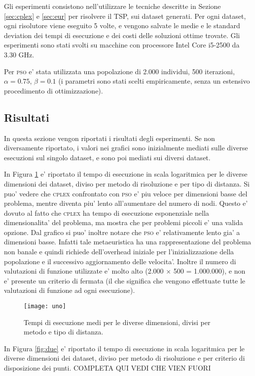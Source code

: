 \documentclass[
12pt, %
a4paper, %
oneside, %
headinclude,footinclude, %
BCOR5mm, %
]{scrartcl}
\begin{document}
Gli esperimenti consistono nell'utilizzare le tecniche descritte in Sezione \ref{sec:cplex} e \ref{sec:eur} per risolvere il TSP, sui dataset generati. Per ogni dataset, ogni risolutore viene eseguito 5 volte, e vengono salvate le medie e le standard deviation dei tempi di esecuzione e dei costi delle soluzioni ottime trovate. Gli esperimenti sono stati svolti su macchine con processore Intel Core i5-2500 da 3.30 GHz. 

Per \textsc{pso} e' stata utilizzata una popolazione di 2.000 individui, 500 iterazioni, $\alpha = 0.75$, $\beta=0.1$ (i parametri sono stati scelti empiricamente, senza un estensivo procedimento di ottimizzazione).

\subsection{Risultati}
In questa sezione vengon riportati i risultati degli esperimenti. Se non diversamente riportato, i valori nei grafici sono inizialmente mediati sulle diverse esecuzioni sul singolo dataset, e sono poi mediati sui diversi dataset.

In Figura \ref{fig:uno} e' riportato il tempo di esecuzione in scala logaritmica per le diverse dimensioni dei dataset, diviso per metodo di risoluzione e per tipo di distanza. Si puo' vedere che \textsc{cplex} confrontato con \textsc{pso} e' piu veloce per dimensioni basse del problema, mentre diventa piu' lento all'aumentare del numero di nodi. Questo e' dovuto al fatto che \textsc{cplex} ha tempo di esecuzione esponenziale nella dimensionalita' del problema, ma mostra che per problemi piccoli e' una valida opzione. Dal grafico si puo' inoltre notare che \textsc{pso} e' relativamente lento gia' a dimensioni basse. Infatti tale metaeuristica ha una rappresentazione del problema non banale e quindi richiede dell'overhead iniziale per l'inizializzazione della popolazione e il successivo aggiornamento delle velocita'. Inoltre il numero di valutazioni di funzione utilizzate e' molto alto (2.000 $\times$ 500 = 1.000.000), e non e' presente un criterio di fermata (il che significa che vengono effettuate tutte le valutazioni di funzione ad ogni esecuzione).
\begin{figure}[htpb]
	\centering
	\texttt{[image: uno]}
	\caption[]{Tempi di esecuzione medi per le diverse dimensioni, divisi per metodo e tipo di distanza.}
	\label{fig:uno}
\end{figure}

In Figura \ref{fig:due} e' riportato il tempo di esecuzione in scala logaritmica per le diverse dimensioni dei dataset, diviso per metodo di risoluzione e per criterio di disposizione dei punti. COMPLETA QUI VEDI CHE VIEN FUORI
\end{document}
